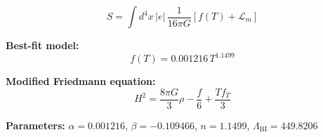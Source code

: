 
\begin{equation}
  S = \int d^4x \, |e| \, \frac{1}{16\pi G} \left[ f(T) + \mathcal{L}_m \right]
\end{equation}

\textbf{Best-fit model:}
\begin{equation}
  f(T) = 0.001216 \, T^{1.1499}
\end{equation}

\textbf{Modified Friedmann equation:}
\begin{equation}
  H^2 = \frac{8\pi G}{3} \rho - \frac{f}{6} + \frac{T f_T}{3}
\end{equation}

\textbf{Parameters:}
$\alpha = 0.001216$, \quad
$\beta = -0.109466$, \quad
$n = 1.1499$, \quad
$\Lambda_{\text{BI}} = 449.8206$